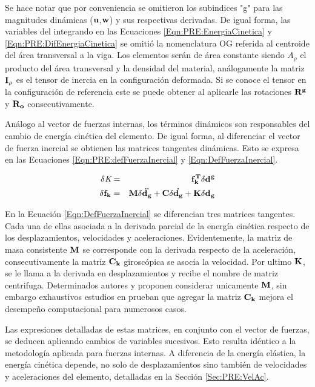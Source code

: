 Se hace notar que por conveniencia se omitieron los subindices "g" para las magnitudes dinámicas ($\bf{u}$,$\bf{w}$)  y sus respectivas derivadas. De igual forma, las variables del integrando en las Ecuaciones  \eqref{Eqn:PRE:EnergiaCinetica} y \eqref{Eqn:PRE:DifEnergiaCinetica} se omitió la nomenclatura OG referida al centroide del área transversal a la viga. Los elementos serán de área constante siendo  $A_{\rho}$  el producto del área transversal  y la densidad del material, análogamente la matriz $\bf{I_{\rho}}$ es el tensor de inercia en la configuración deformada. Si se conoce el tensor en la configuración de referencia este se puede obtener al aplicarle las rotaciones $\bf{R}^g$ y $\bf{R}_o$ consecutivamente. 
  
Análogo al vector de fuerzas internas, los términos dinámicos son responsables del cambio de energía cinética del elemento. De igual forma, al diferenciar el vector de fuerza inercial se obtienen las matrices tangentes dinámicas. Esto se expresa en las Ecuaciones \eqref{Eqn:PRE:defFuerzaInercial} y \eqref{Eqn:DefFuerzaInercial}.  

\begin{eqnarray}
		\label{Eqn:PRE:defFuerzaInercial}
	\delta\textit{K}&=&\bf{f_k^T}\delta\bf{d}^g\\
	\label{Eqn:DefFuerzaInercial}
	\delta\bf{f_k}&=& \bf{M}\delta \ddot{\bf{d_g}}+\bf{C}\delta
	\dot{\bf{d_g}}+\bf{K}\delta{\bf{d_g}} 
\end{eqnarray}


En la Ecuación \ref{Eqn:DefFuerzaInercial} se diferencian tres matrices tangentes. Cada una de ellas asociada a la derivada parcial de la energía cinética respecto de los desplazamientos, velocidades y aceleraciones. Evidentemente, la matriz de masa consistente $\bf{M}$ se corresponde con la derivada respecto de la aceleración, consecutivamente la matriz $\bf{C_k}$
giroscópica se asocia la velocidad. Por ultimo $\bf{K}$, se le llama a la derivada en desplazamientos y recibe el nombre de matriz centrifuga. Determinados autores \cite{cardona1988beam} y \cite{hsiao1999consistent} proponen considerar unicamente $\bf{M}$, sin embargo exhaustivos estudios en \citep{hsiao1999consistent} prueban que agregar la matriz $\bf{C_k}$ mejora el desempeño computacional para numerosos casos. 

Las expresiones detalladas de estas matrices, en conjunto con el vector de fuerzas, se deducen aplicando cambios de variables sucesivos. Esto resulta idéntico a la metodología aplicada para fuerzas internas. A diferencia de la energía elástica, la energía cinética depende, no solo de desplazamientos sino también de velocidades y aceleraciones del elemento, detalladas en la Sección \ref{Sec:PRE:VelAc}.


